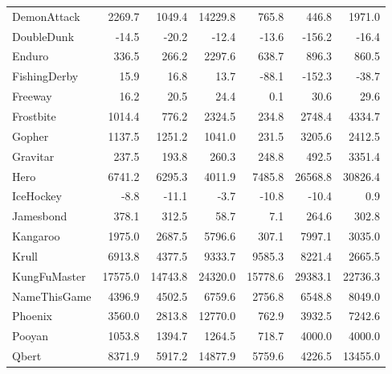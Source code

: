 \begin{table}[h]
{\begin{tabular}{lrrrrrr}
DemonAttack    &     2269.7 &    1049.4 &                14229.8 &     765.8 &           446.8 &   1971.0 \\
DoubleDunk     &      -14.5 &     -20.2 &                  -12.4 &     -13.6 &          -156.2 &    -16.4 \\
Enduro         &      336.5 &     266.2 &                 2297.6 &     638.7 &           896.3 &    860.5 \\
FishingDerby   &       15.9 &      16.8 &                   13.7 &     -88.1 &          -152.3 &    -38.7 \\
Freeway        &       16.2 &      20.5 &                   24.4 &       0.1 &            30.6 &     29.6 \\
Frostbite      &     1014.4 &     776.2 &                 2324.5 &     234.8 &          2748.4 &   4334.7 \\
Gopher         &     1137.5 &    1251.2 &                 1041.0 &     231.5 &          3205.6 &   2412.5 \\
Gravitar       &      237.5 &     193.8 &                  260.3 &     248.8 &           492.5 &   3351.4 \\
Hero           &     6741.2 &    6295.3 &                 4011.9 &    7485.8 &         26568.8 &  30826.4 \\
IceHockey      &       -8.8 &     -11.1 &                   -3.7 &     -10.8 &           -10.4 &      0.9 \\
Jamesbond      &      378.1 &     312.5 &                   58.7 &       7.1 &           264.6 &    302.8 \\
Kangaroo       &     1975.0 &    2687.5 &                 5796.6 &     307.1 &          7997.1 &   3035.0 \\
Krull          &     6913.8 &    4377.5 &                 9333.7 &    9585.3 &          8221.4 &   2665.5 \\
KungFuMaster   &    17575.0 &   14743.8 &                24320.0 &   15778.6 &         29383.1 &  22736.3 \\
NameThisGame   &     4396.9 &    4502.5 &                 6759.6 &    2756.8 &          6548.8 &   8049.0 \\
Phoenix        &     3560.0 &    2813.8 &                12770.0 &     762.9 &          3932.5 &   7242.6 \\
Pooyan         &     1053.8 &    1394.7 &                 1264.5 &     718.7 &          4000.0 &   4000.0 \\
Qbert          &     8371.9 &    5917.2 &                14877.9 &    5759.6 &          4226.5 &  13455.0 \\

\end{tabular}}
\end{table}
